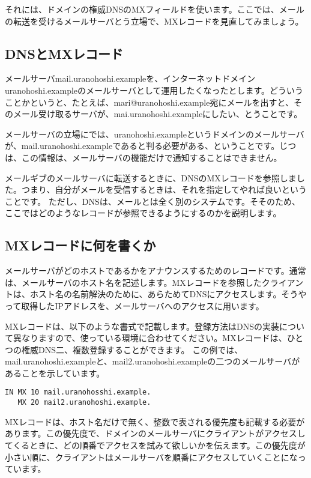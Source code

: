 それには、ドメインの権威DNSのMXフィールドを使います。ここでは、メールの転送を受けるメールサーバとう立場で、MXレコードを見直してみましょう。

\subsection{DNSとMXレコード}

メールサーバmail.uranohoshi.exampleを、インターネットドメインuranohoshi.exampleのメールサーバとして運用したくなったとします。どういうことかというと、たとえば、mari@uranohoshi.example宛にメールを出すと、そのメール受け取るサーバが、mai.uranohoshi.exampleにしたい、とうことです。

メールサーバの立場にでは、uranohoshi.exampleというドメインのメールサーバが、mail.uranohoshi.exampleであると判る必要がある、ということです。じつは、この情報は、メールサーバの機能だけで通知することはできません。

メールギブのメールサーバに転送するときに、DNSのMXレコードを参照しました。つまり、自分がメールを受信するときは、それを指定してやれば良いということです。
ただし、DNSは、メールとは全く別のシステムです。そそのため、ここではどのようなレコードが参照できるようにするのかを説明します。

\subsection{MXレコードに何を書くか}

メールサーバがどのホストであるかをアナウンスするためのレコードです。通常は、メールサーバのホスト名を記述します。MXレコードを参照したクライアントは、ホスト名の名前解決のために、あらためてDNSにアクセスします。そうやって取得したIPアドレスを、メールサーバへのアクセスに用います。

MXレコードは、以下のような書式で記載します。登録方法はDNSの実装について異なりますので、使っている環境に合わせてください。MXレコードは、ひとつの権威DNS二、複数登録することができます。
この例では、mail.uranohoshi.exampleと、mail2.uranohoshi.exampleの二つのメールサーバがあることを示しています。

\begin{verbatim}
IN MX 10 mail.uranohosshi.example.
   MX 20 mail2.uranohoshi.example.
\end{verbatim}

MXレコードは、ホスト名だけで無く、整数で表される優先度も記載する必要があります。この優先度で、ドメインのメールサーバにクライアントがアクセスしてくるときに、どの順番でアクセスを試みて欲しいかを伝えます。この優先度が小さい順に、クライアントはメールサーバを順番にアクセスしていくことになっています。

